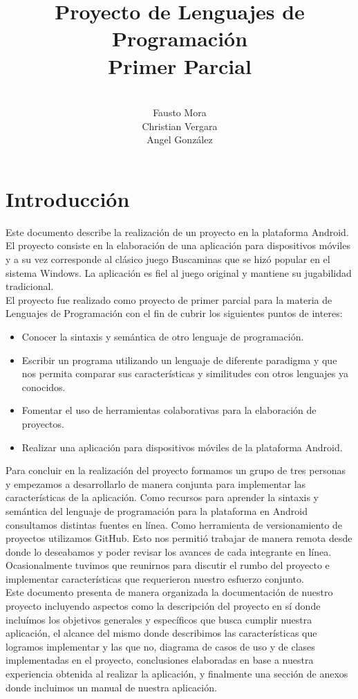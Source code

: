 \documentclass[11pt]{article} %
\title{Proyecto de Lenguajes de Programaci\'on \\ Primer Parcial}
\author{\\Fausto Mora \\Christian Vergara \\ Angel Gonz\'alez}
\begin{document}

\maketitle

\newpage
\thispagestyle{empty}
\tableofcontents

\newpage
\thispagestyle{empty}


\section{\textbf{Introducción}}

Este documento describe la realizaci\'on de un proyecto en la plataforma Android. El proyecto consiste en la elaboraci\'on de una aplicaci\'on para dispositivos m\'oviles y a su vez corresponde al cl\'asico juego Buscaminas que se hiz\'o popular en el sistema Windows. La aplicaci\'on es fiel al juego original y mantiene su jugabilidad tradicional.
\\El proyecto fue realizado como proyecto de primer parcial para la materia de Lenguajes de Programaci\'on con el fin de cubrir los siguientes puntos de interes:
\begin{itemize}
\item Conocer la sintaxis y semántica de otro lenguaje de programación.
\item Escribir un programa utilizando un lenguaje de diferente paradigma y que nos permita comparar sus características y similitudes con otros lenguajes ya conocidos.
\item Fomentar el uso de herramientas colaborativas para la elaboraci\'on de proyectos.
\item Realizar una aplicaci\'on para dispositivos m\'oviles de la plataforma Android.
\end{itemize}
Para concluir en la realizaci\'on del proyecto formamos un grupo de tres personas y empezamos a desarrollarlo de manera conjunta para implementar las caracter\'isticas de la aplicaci\'on. Como recursos para aprender la sintaxis y sem\'antica del lenguaje de programaci\'on para la plataforma en Android consultamos distintas fuentes en l\'inea. Como herramienta de versionamiento de proyectos utilizamos GitHub. Esto nos permiti\'o trabajar de manera remota desde donde lo deseabamos y poder revisar los avances de cada integrante en l\'inea. Ocasionalmente tuvimos que reunirnos para discutir el rumbo del proyecto e implementar caracter\'isticas que requerieron nuestro esfuerzo conjunto.
\\Este documento presenta de manera organizada la documentaci\'on de nuestro proyecto incluyendo aspectos como la descripci\'on del proyecto en s\'i donde inclu\'imos los objetivos generales y espec\'ificos que busca cumplir nuestra aplicaci\'on, el alcance del mismo donde describimos las caracter\'isticas que logramos implementar y las que no, diagrama de casos de uso y de clases implementadas en el proyecto, conclusiones elaboradas en base a nuestra experiencia obtenida al realizar la aplicaci\'on, y finalmente una secci\'on de anexos donde incluimos un manual de nuestra aplicaci\'on.
\end{document}

